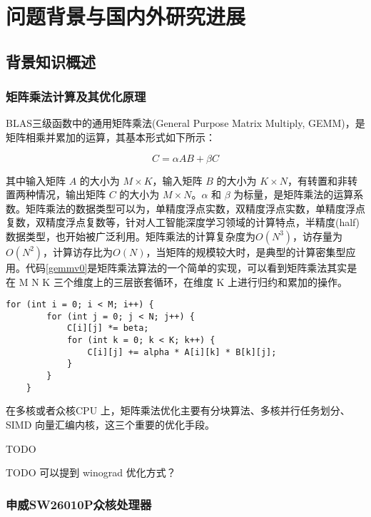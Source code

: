 

\chapter{问题背景与国内外研究进展}


\section{背景知识概述}

\subsection{矩阵乘法计算及其优化原理}

BLAS三级函数中的通用矩阵乘法(General Purpose Matrix Multiply, GEMM)，是矩阵相乘并累加的运算\cite{UpdatedSetBasic2002}，其基本形式如下所示：

\begin{equation}
     C = \alpha AB + \beta C 
\end{equation}

其中输入矩阵 $A$ 的大小为 $M \times K$，输入矩阵 $B$ 的大小为 $K \times N$，有转置和非转置两种情况，输出矩阵 $C$ 的大小为 $M \times N$。$\alpha$ 和 $\beta$ 为标量，是矩阵乘法的运算系数。矩阵乘法的数据类型可以为，单精度浮点实数，双精度浮点实数，单精度浮点复数，双精度浮点复数等，针对人工智能深度学习领域的计算特点，半精度(half)数据类型，也开始被广泛利用。矩阵乘法的计算复杂度为$O\left(N^3\right)$，访存量为$O\left(N^2\right)$，计算访存比为$O\left(N\right)$，当矩阵的规模较大时，是典型的计算密集型应用。代码\ref{gemmv0}是矩阵乘法算法的一个简单的实现，可以看到矩阵乘法其实是在 M N K 三个维度上的三层嵌套循环，在维度 K 上进行归约和累加的操作。

\begin{lstlisting}[caption=矩阵乘法的简单实现, label=gemmv0]
    for (int i = 0; i < M; i++) {
        for (int j = 0; j < N; j++) {
            C[i][j] *= beta;
            for (int k = 0; k < K; k++) {
                C[i][j] += alpha * A[i][k] * B[k][j];
            }
        }
    }
\end{lstlisting}

在多核或者众核CPU 上，矩阵乘法优化主要有分块算法、多核并行任务划分、SIMD 向量汇编内核，这三个重要的优化手段。

TODO


TODO 可以提到 winograd 优化方式？


\subsection{申威SW26010P众核处理器}




